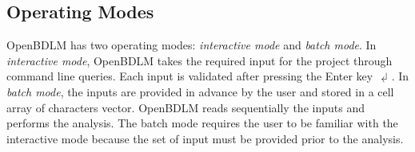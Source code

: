 \subsection{Operating Modes}
\label{S:OPENBDLMRUNNINGMODES}
OpenBDLM has two operating modes: \emph{interactive mode} and \emph{batch mode}. In \emph{interactive mode}, OpenBDLM takes the required input for the project through \MATLAB{} command line queries. Each input is validated after pressing the Enter key $\dlsh$. In \emph{batch mode}, the inputs are provided in advance by the user and stored in a cell array of characters vector. OpenBDLM reads sequentially the inputs and performs the analysis. The batch mode requires the user to be familiar with the interactive mode because the set of input must be provided prior to the analysis.
